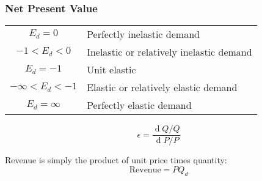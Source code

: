 \documentclass{beamer}
\begin{document}
\begin{frame}
\frametitle{Net Present Value}
\Large
\begin{centering}
\begin{tabular}{|c|l|} \hline
$E_d = 0$ & Perfectly inelastic demand \\
$- 1 < E_d < 0 $ &Inelastic or relatively inelastic demand\\
$E_d=  - 1 $& Unit elastic\\
$ - \infty < E_d < - 1$ & 
Elastic or relatively elastic demand \\
$E_d = \infty $&
Perfectly elastic demand \\ \hline
\end{tabular} 
\end{centering}
\end{frame}


\begin{frame}
\[ \epsilon = \frac{\operatorname d Q/Q}{\operatorname d P/P} \]



 Revenue is simply the product of unit price times quantity:
  \[﻿ \mbox{Revenue} = PQ_d﻿\]
\end{frame}
\end{document}
